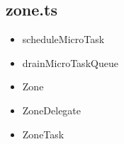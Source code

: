\subsection{zone.ts}












\begin{itemize}
  \item scheduleMicroTask
  \item drainMicroTaskQueue
\end{itemize}


\begin{itemize}
  \item Zone
  \item ZoneDelegate
  \item ZoneTask
\end{itemize}



